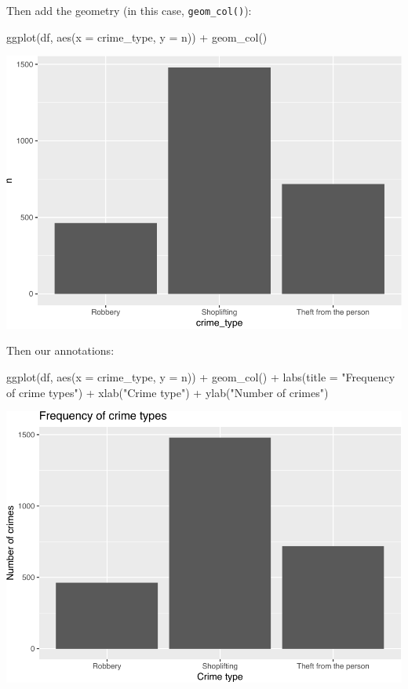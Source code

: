 \documentclass[
  krantz2]{krantz}
\makeatletter
\newenvironment{Shaded}{\begin{snugshade}}{\end{snugshade}}
\newcommand{\AttributeTok}[1]{\textcolor[rgb]{0.61,0.61,0.61}{#1}}
\newcommand{\FunctionTok}[1]{\textcolor[rgb]{0,0,0}{#1}}
\newcommand{\NormalTok}[1]{#1}
\newcommand{\SpecialCharTok}[1]{\textcolor[rgb]{0,0,0}{#1}}
\newcommand{\StringTok}[1]{\textcolor[rgb]{0.5,0.5,0.5}{#1}}
\newenvironment{kframe}{%
\medskip{}
\setlength{\fboxsep}{.8em}
 \def\at@end@of@kframe{}%
 \ifinner\ifhmode%
  \def\at@end@of@kframe{\end{minipage}}%
  \begin{minipage}{\columnwidth}%
 \fi\fi%
 \def\FrameCommand##1{\hskip\@totalleftmargin \hskip-\fboxsep
 \colorbox{shadecolor}{##1}\hskip-\fboxsep
     \hskip-\linewidth \hskip-\@totalleftmargin \hskip\columnwidth}%
 \MakeFramed {\advance\hsize-\width
   \@totalleftmargin\z@ \linewidth\hsize
   \@setminipage}}%
 {\par\unskip\endMakeFramed%
 \at@end@of@kframe}
\renewenvironment{Shaded}{\begin{kframe}}{\end{kframe}}
\makeatother
\begin{document}
Then add the geometry (in this case, \texttt{geom\_col()}):

\begin{Shaded}
\begin{Highlighting}[]
\FunctionTok{ggplot}\NormalTok{(df, }\FunctionTok{aes}\NormalTok{(}\AttributeTok{x =}\NormalTok{ crime\_type, }\AttributeTok{y =}\NormalTok{ n)) }\SpecialCharTok{+} 
  \FunctionTok{geom\_col}\NormalTok{()}
\end{Highlighting}
\end{Shaded}

\includegraphics{crime_mapping_files/figure-latex/unnamed-chunk-9-1.pdf}

Then our annotations:

\begin{Shaded}
\begin{Highlighting}[]
\FunctionTok{ggplot}\NormalTok{(df, }\FunctionTok{aes}\NormalTok{(}\AttributeTok{x =}\NormalTok{ crime\_type, }\AttributeTok{y =}\NormalTok{ n)) }\SpecialCharTok{+} 
  \FunctionTok{geom\_col}\NormalTok{() }\SpecialCharTok{+} 
  \FunctionTok{labs}\NormalTok{(}\AttributeTok{title =} \StringTok{"Frequency of crime types"}\NormalTok{) }\SpecialCharTok{+} 
  \FunctionTok{xlab}\NormalTok{(}\StringTok{"Crime type"}\NormalTok{) }\SpecialCharTok{+} 
  \FunctionTok{ylab}\NormalTok{(}\StringTok{"Number of crimes"}\NormalTok{)}
\end{Highlighting}
\end{Shaded}

\includegraphics{crime_mapping_files/figure-latex/unnamed-chunk-10-1.pdf}
\end{document}
